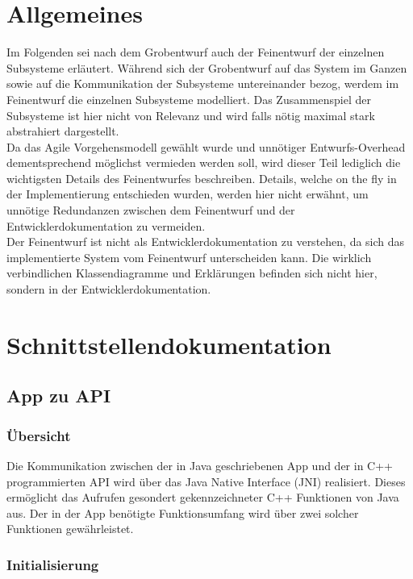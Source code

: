 \documentclass[12pt,a4paper,ngerman,enabledeprecatedfontcommands]{scrreprt}
\begin{document}
\chapter{Allgemeines}
Im Folgenden sei nach dem Grobentwurf auch der Feinentwurf der einzelnen Subsysteme erläutert. Während sich der Grobentwurf auf das System im Ganzen sowie auf die Kommunikation der Subsysteme untereinander bezog, werdem im Feinentwurf die einzelnen Subsysteme modelliert. Das Zusammenspiel der Subsysteme ist hier nicht von Relevanz und wird falls nötig maximal stark abstrahiert dargestellt.\\
Da das Agile Vorgehensmodell gewählt wurde und unnötiger Entwurfs-Overhead dementsprechend möglichst vermieden werden soll, wird dieser Teil lediglich die wichtigsten Details des Feinentwurfes beschreiben. Details, welche \glqq{}on the fly\grqq{} in der Implementierung entschieden wurden, werden hier nicht erwähnt, um unnötige Redundanzen zwischen dem Feinentwurf und der Entwicklerdokumentation zu vermeiden.\\

Der Feinentwurf ist nicht als Entwicklerdokumentation zu verstehen, da sich das implementierte System vom Feinentwurf unterscheiden kann. Die wirklich verbindlichen Klassendiagramme und Erklärungen befinden sich nicht hier, sondern in der Entwicklerdokumentation.\\


\chapter{Schnittstellendokumentation}


\section{App zu API}
\label{sec:schnittstellendokuAPPAPI}

\subsection{Übersicht}

Die Kommunikation zwischen der in Java geschriebenen App und der in C++ programmierten API wird über das Java Native Interface (JNI) realisiert. Dieses ermöglicht das Aufrufen gesondert gekennzeichneter C++ Funktionen von Java aus. Der in der App benötigte Funktionsumfang wird über zwei solcher Funktionen gewährleistet.\\

\subsection{Initialisierung}
\end{document}
